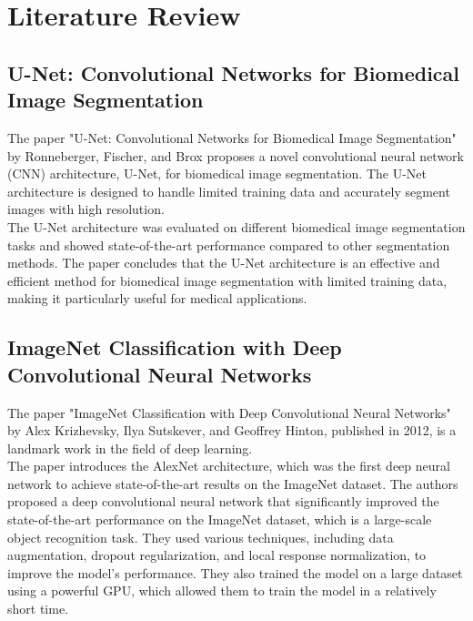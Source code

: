 \documentclass[11pt,a4paper]{article}
\begin{document}
\section*{Literature Review}

\subsection{U-Net: Convolutional Networks for Biomedical Image Segmentation}

\noindent The paper "U-Net: Convolutional Networks for Biomedical Image Segmentation" by Ronneberger, Fischer, and Brox proposes a novel convolutional neural network (CNN) architecture, U-Net, for biomedical image segmentation. The U-Net architecture is designed to handle limited training data and accurately segment images with high resolution.\\


\noindent The U-Net architecture was evaluated on different biomedical image segmentation tasks and showed state-of-the-art performance compared to other segmentation methods. The paper concludes that the U-Net architecture is an effective and efficient method for biomedical image segmentation with limited training data, making it particularly useful for medical applications.\cite {krizhevsky2012imagenet}


\subsection{ImageNet Classification with Deep Convolutional Neural Networks}

\noindent The paper "ImageNet Classification with Deep Convolutional Neural Networks" by Alex Krizhevsky, Ilya Sutskever, and Geoffrey Hinton, published in 2012, is a landmark work in the field of deep learning.\\

\noindent The paper introduces the AlexNet architecture, which was the first deep neural network to achieve state-of-the-art results on the ImageNet dataset. The authors proposed a deep convolutional neural network that significantly improved the state-of-the-art performance on the ImageNet dataset, which is a large-scale object recognition task. They used various techniques, including data augmentation, dropout regularization, and local response normalization, to improve the model's performance. They also trained the model on a large dataset using a powerful GPU, which allowed them to train the model in a relatively short time.\\
\end{document}
